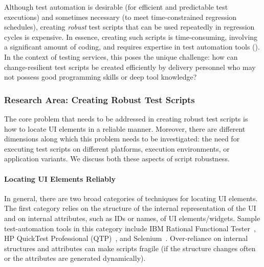 Although test automation is desirable (\eg for efficient and predictable test
executions) and sometimes necessary (\eg to meet time-constrained regression
schedules), creating \textit{robust} test scripts that can be used repeatedly in
regression cycles is expensive. In essence, creating such scripts is
time-consuming, involving a significant amount of coding, and requires expertise
in test automation tools (\eg \cite{hpqtp,ibmrft,selenium}). In the context of
testing services, this poses the unique challenge: how can change-resilient test
scripts be created efficiently by delivery personnel who may not possess good
programming skills or deep tool knowledge? 


\subsubsection*{Research Area: Creating Robust Test Scripts}

The core problem that needs to be addressed in creating robust test scripts is
how to locate UI elements in a reliable manner. Moreover, there are different
dimensions along which this problem needs to be investigated: the need for
executing test scripts on different platforms, execution environments, or
application variants. We discuss both these aspects of script robustness.

\vskip -5pt
\paragraph*{Locating UI Elements Reliably} In general, there are two broad categories of
techniques for locating UI elements. The first category relies on the structure
of the internal representation of the UI
and on internal attributes, such as IDs or names, of UI elements/widgets. Sample
test-automation tools in this category include IBM Rational Functional
Tester~\cite{ibmrft}, HP QuickTest Professional (QTP)~\cite{hpqtp}, and
Selenium~\cite{selenium}. Over-reliance on internal structures and attributes
can make scripts fragile (\eg if the structure changes often or the attributes
are generated dynamically).


